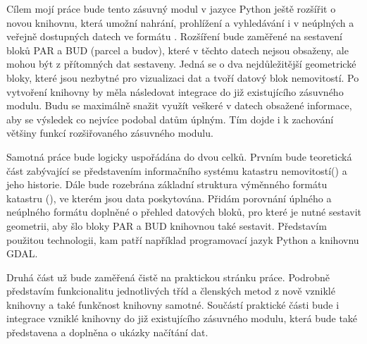 Cílem mojí práce bude tento zásuvný modul v jazyce Python ještě
rozšířit o novou knihovnu, která umožní nahrání, prohlížení a
vyhledávání i v neúplných a veřejně dostupných datech ve formátu
. Rozšíření bude zaměřené na sestavení bloků PAR a BUD (parcel
a budov), které v těchto datech nejsou obsaženy, ale mohou být z
přítomných dat sestaveny. Jedná se o dva nejdůležitější geometrické
bloky, které jsou nezbytné pro vizualizaci dat a tvoří datový blok
nemovitostí. Po vytvoření knihovny by měla následovat integrace do již
existujícího zásuvného modulu. Budu se maximálně snažit využít veškeré
v datech obsažené informace, aby se výsledek co nejvíce podobal datům
úplným. Tím dojde i k zachování většiny funkcí rozšiřovaného zásuvného
modulu.

Samotná práce bude logicky uspořádána do dvou celků. Prvním bude
teoretická část zabývající se představením informačního systému
katastru nemovitostí() a jeho historie. Dále bude rozebrána
základní struktura výměnného formátu katastru (), ve kterém
jsou data poskytována. Přidám porovnání úplného a neúplného formátu
doplněné o přehled datových bloků, pro které je nutné sestavit
geometrii, aby šlo bloky PAR a BUD knihovnou také sestavit. Představím
použitou technologii, kam patří například programovací jazyk Python a
knihovnu GDAL.

Druhá část už bude zaměřená čistě na praktickou stránku
práce. Podrobně představím funkcionalitu jednotlivých tříd a členských
metod z nově vzniklé knihovny a také funkčnost knihovny
samotné. Součástí praktické části bude i integrace vzniklé knihovny do
již existujícího zásuvného modulu, která bude také představena a
doplněna o ukázky načítání dat.


